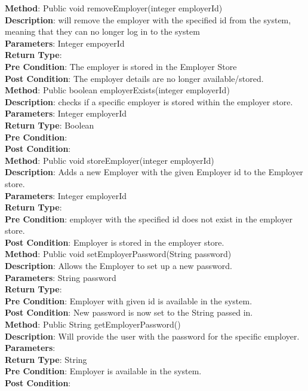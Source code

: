 \documentclass{l3deliverable}
\begin{document}
\textbf{Method}: Public void removeEmployer(integer employerId) \\
\textbf{Description}: will remove the employer with the specified id from the system, meaning that they can no longer log in to the system\\
\textbf{Parameters}: Integer empoyerId\\
\textbf{Return Type}:\\
\textbf{Pre Condition}: The employer is stored in the Employer Store\\
\textbf{Post Condition}: The employer details are no longer available/stored.\\

\textbf{Method}: Public boolean employerExists(integer employerId) \\
\textbf{Description}: checks if a specific employer is stored within the employer store.\\
\textbf{Parameters}: Integer employerId\\
\textbf{Return Type}: Boolean\\
\textbf{Pre Condition}:\\
\textbf{Post Condition}:\\

\textbf{Method}: Public void storeEmployer(integer employerId) \\
\textbf{Description}:  Adds a new Employer with the given Employer id to the Employer store.\\
\textbf{Parameters}: Integer employerId\\
\textbf{Return Type}:\\
\textbf{Pre Condition}: employer with the specified id does not exist in the employer store.\\
\textbf{Post Condition}: Employer is stored in the employer store.\\

\textbf{Method}: Public void setEmployerPassword(String password) \\
\textbf{Description}: Allows the Employer to set up a new password.\\
\textbf{Parameters}: String password\\
\textbf{Return Type}: \\
\textbf{Pre Condition}: Employer with given id is available in the system.\\
\textbf{Post Condition}: New password is now set to the String passed in.\\

\textbf{Method}: Public String getEmployerPassword() \\
\textbf{Description}: Will provide the user with the password for the specific employer.\\
\textbf{Parameters}:\\
\textbf{Return Type}: String \\
\textbf{Pre Condition}: Employer is available in the system.\\
\textbf{Post Condition}:\\
\end{document}
